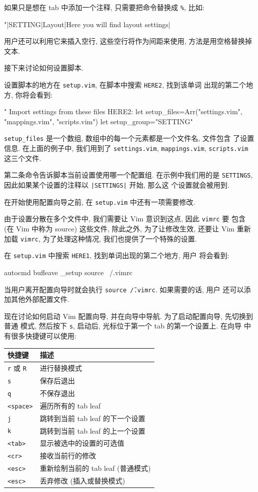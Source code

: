如果只是想在 tab 中添加一个注释, 只需要把命令替换成 \verb'%', 比如:
\begin{vimcode}
"|SETTING|Layout|Here you will find layout settings|%
\end{vimcode}
用户还可以利用它来插入空行, 这些空行将作为间距来使用, 方法是用空格替换掉文本.

接下来讨论如何设置脚本.

设置脚本的地方在 \texttt{setup.vim}, 在脚本中搜索 \texttt{HERE2}, 找到该单词
出现的第二个地方, 你将会看到:
\begin{vimcode}
" Import settings from these files HERE2:
let setup_files=Arr("settings.vim", "mappings.vim", "scripts.vim")
let setup_group="SETTING"
\end{vimcode}

\texttt{setup\_files} 是一个数组, 数组中的每一个元素都是一个文件名, 文件包含
了设置信息. 在上面的例子中, 我们用到了 \texttt{settings.vim},
\texttt{mappings.vim}, \texttt{scripts.vim} 这三个文件.

第二条命令告诉脚本当前设置使用哪一个配置组. 在示例中我们用的是
\texttt{SETTINGS}, 因此如果某个设置的注释以 \texttt{|SETTINGS|} 开始, 那么这
个设置就会被用到.

在开始使用配置向导之前, 在 \texttt{setup.vim} 中还有一项需要修改.

由于设置分散在多个文件中, 我们需要让 Vim 意识到这点, 因此 \texttt{vimrc} 要
包含 (在 Vim 中称为 source) 这些文件, 除此之外, 为了让修改生效, 还要让 Vim
重新加载 \texttt{vimrc}, 为了处理这种情况, 我们也提供了一个特殊的设置.

在 \texttt{setup.vim} 中搜索 \texttt{HERE1}, 找到单词出现的第二个地方, 用户
将会看到:
\begin{vimcode}
autocmd bufleave _setup source ~/.vimrc
\end{vimcode}
当用户离开配置向导时就会执行 \texttt{source \~/.vimrc}. 如果需要的话, 用户
还可以添加其他外部配置文件.

现在讨论如何启动 Vim 配置向导, 并在向导中导航. 为了启动配置向导, 先切换到普通
模式, 然后按下 \texttt{s}, 启动后, 光标位于第一个 tab 的第一个设置上. 在向导
中有很多快捷键可以使用:
\begin{center}
  \begin{tabular}{ll}
    \hline
	快捷键  & 描述 \\
    \hline
    \texttt{r} 或 \texttt{R}  & 进行替换模式 \\
	\texttt{s} & 保存后退出 \\
	\texttt{q} & 不保存退出 \\
	\texttt{<space>} & 遍历所有的 tab leaf \\
	\texttt{j} & 跳转到当前 tab leaf 的下一个设置 \\
	\texttt{k} & 跳转到当前 tab leaf 的上一个设置 \\
	\texttt{<tab>} & 显示被选中的设置的可选值 \\
	\texttt{<cr>} & 接收当前行的修改 \\
	\texttt{<esc>} & 重新绘制当前的 tab leaf (普通模式) \\
	\texttt{<esc>} & 丢弃修改 (插入或替换模式) \\
	\hline
  \end{tabular}
\end{center}

